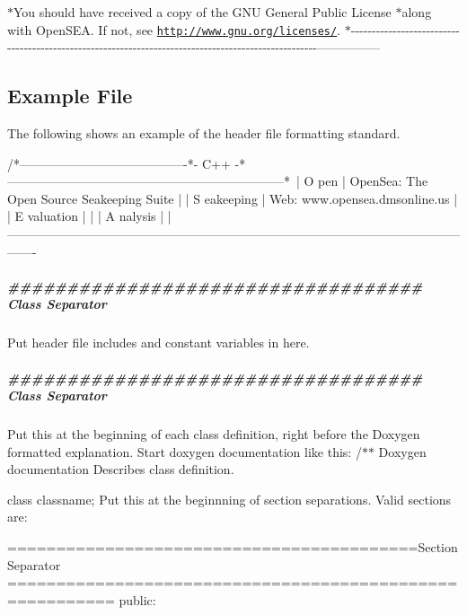 $\ast$\-You should have received a copy of the G\-N\-U General Public License $\ast$along with Open\-S\-E\-A. If not, see \href{http://www.gnu.org/licenses/}{\tt http\-://www.\-gnu.\-org/licenses/}. $\ast$-\/-\/-\/-\/-\/-\/-\/-\/-\/-\/-\/-\/-\/-\/-\/-\/-\/-\/-\/-\/-\/-\/-\/-\/-\/-\/-\/-\/-\/-\/-\/-\/-\/-\/-\/-\/-\/-\/-\/-\/-\/-\/-\/-\/-\/-\/-\/-\/-\/-\/-\/-\/-\/-\/-\/-\/-\/-\/-\/-\/-\/-\/-\/-\/-\/-\/-\/-\/-\/-\/-\/-\/-\/-\/-\/-\/-\/-\/-\/-\/-\/-\/-\/-\/-\/-\/-\/-\/-\/-\/-\/-\/-\/-\/-\/-\/-\/-\/-\/-\/---------------\hypertarget{class_test_examplefile}{}\subsection{Example File}\label{class_test_examplefile}
The following shows an example of the header file formatting standard. \begin{DoxyVerb}  /*----------------------------------------*- C++ -*------------------------------------------------------------------*\
  | O pen         | OpenSea: The Open Source Seakeeping Suite                                                           |
  | S eakeeping   | Web:     www.opensea.dmsonline.us                                                                   |
  | E valuation   |                                                                                                     |
  | A nalysis     |                                                                                                     |
  \*------------------------------------------------------------------------------------------------------------------- \end{DoxyVerb}


\subparagraph*{\#\#\#\#\#\#\#\#\#\#\#\#\#\#\#\#\#\#\#\#\#\#\#\#\#\#\#\#\#\#\#\#\#\#\# Class Separator}

Put header file includes and constant variables in here.

\subparagraph*{\#\#\#\#\#\#\#\#\#\#\#\#\#\#\#\#\#\#\#\#\#\#\#\#\#\#\#\#\#\#\#\#\#\#\# Class Separator}

Put this at the beginning of each class definition, right before the Doxygen formatted explanation. Start doxygen documentation like this\-: /$\ast$$\ast$ Doxygen documentation Describes class definition.

class classname; Put this at the beginnning of section separations. Valid sections are\-:

==========================================Section Separator ========================================================= public\-:

